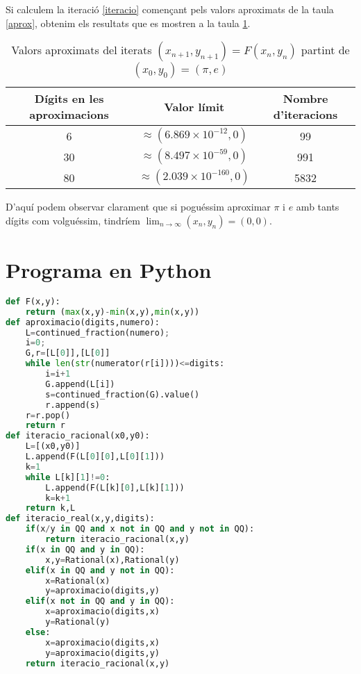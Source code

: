 \documentclass[11pt,a4paper]{article}
\theoremstyle{definition}
\begin{document}
Si calculem la iteració \eqref{iteracio} començant pels valors aproximats de la taula \ref{aprox}, obtenim els resultats que es mostren a la taula \ref{pi-e}.\par
\begin{table}[!ht]
    \centering
    \begin{tabular}{|c|c|c|}
        \hline
        Dígits en les aproximacions & Valor límit                       & Nombre d'iteracions \\
        \hline
        6                           & $\approx(6.869\times10^{-12},0)$  & 99                  \\
        \hline
        30                          & $\approx(8.497\times10^{-59},0)$  & 991                 \\
        \hline
        80                          & $\approx(2.039\times10^{-160},0)$ & 5832                \\
        \hline
    \end{tabular}
    \caption{Valors aproximats del iterats $(x_{n+1},y_{n+1})=F(x_n,y_n)$ partint de $(x_0,y_0)=(\pi,e)$}
    \label{pi-e}
\end{table}
D'aquí podem observar clarament que si poguéssim aproximar $\pi$ i $e$ amb tants dígits com volguéssim, tindríem $\displaystyle\lim_{n\to\infty}(x_n,y_n)=(0,0)$.
\newpage
\appendix
\section{Programa en Python}\label{appendix1}
\begin{lstlisting}[language=Python, caption={Programa que calcula el nombre i la llista de termes $(x_n,y_n)$ de la successió donada per \eqref{iteracio}}]
def F(x,y):
    return (max(x,y)-min(x,y),min(x,y))
def aproximacio(digits,numero):
    L=continued_fraction(numero);
    i=0;
    G,r=[L[0]],[L[0]]
    while len(str(numerator(r[i])))<=digits:
        i=i+1
        G.append(L[i])
        s=continued_fraction(G).value()
        r.append(s)
    r=r.pop()
    return r
def iteracio_racional(x0,y0):
    L=[(x0,y0)]
    L.append(F(L[0][0],L[0][1]))
    k=1
    while L[k][1]!=0:
        L.append(F(L[k][0],L[k][1]))
        k=k+1
    return k,L
def iteracio_real(x,y,digits):
    if(x/y in QQ and x not in QQ and y not in QQ):
        return iteracio_racional(x,y)
    if(x in QQ and y in QQ):
        x,y=Rational(x),Rational(y)
    elif(x in QQ and y not in QQ):
        x=Rational(x)
        y=aproximacio(digits,y)
    elif(x not in QQ and y in QQ):
        x=aproximacio(digits,x)
        y=Rational(y)
    else:
        x=aproximacio(digits,x)
        y=aproximacio(digits,y)
    return iteracio_racional(x,y)
\end{lstlisting}
\printbibliography[heading=bibintoc,title={Referències}]
\end{document}
